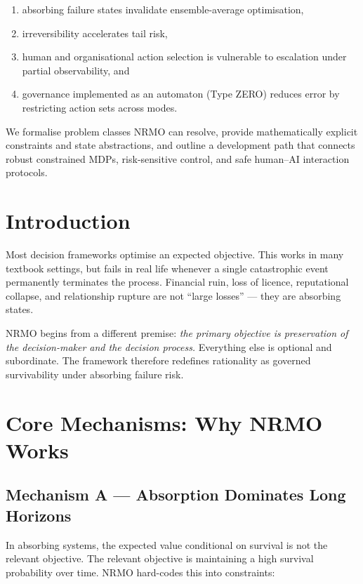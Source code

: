 \begin{enumerate}
\item absorbing failure states invalidate ensemble-average
optimisation,
\item irreversibility accelerates tail risk,
\item human and organisational action selection is vulnerable to
escalation under partial observability, and
\item governance implemented as an automaton (Type ZERO) reduces
error by restricting action sets across modes.
\end{enumerate}

\noindent
We formalise problem classes NRMO can resolve, provide
mathematically explicit constraints and state abstractions, and
outline a development path that connects robust constrained MDPs,
risk-sensitive control, and safe human--AI interaction protocols.

\section{Introduction}
\label{sec:foundations-intro}

Most decision frameworks optimise an expected objective. This works
in many textbook settings, but fails in real life whenever a single
catastrophic event permanently terminates the process. Financial
ruin, loss of licence, reputational collapse, and relationship
rupture are not ``large losses'' --- they are absorbing states.

NRMO begins from a different premise: \emph{the primary objective is
preservation of the decision-maker and the decision process.}
Everything else is optional and subordinate. The framework therefore
redefines rationality as governed survivability under absorbing
failure risk.

\section{Core Mechanisms: Why NRMO Works}
\label{sec:foundations-1-1-core-mechanisms}

\subsection*{Mechanism A --- Absorption Dominates Long Horizons}

In absorbing systems, the expected value conditional on survival is
not the relevant objective. The relevant objective is maintaining a
high survival probability over time. NRMO hard-codes this into
constraints:

